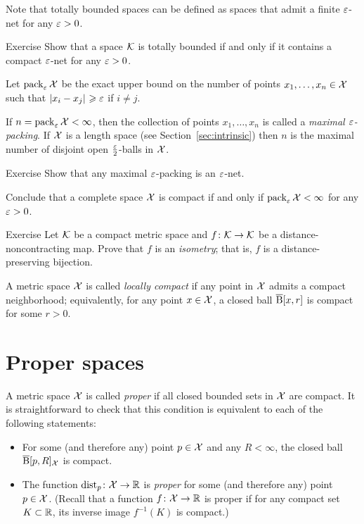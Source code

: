 Note that totally bounded spaces can be defined as spaces that admit a finite $\varepsilon$-net for any $\varepsilon>0$.

\begin{thm}{Exercise}\label{ex:compact-net}
Show that a space $\mathcal{K}$ is totally bounded if and only if it contains a compact $\varepsilon$-net for any $\varepsilon>0$. 
\end{thm}


Let $\operatorname{\rm pack}\nolimits_\varepsilon\mathcal{X}$ be the exact upper bound on the number of points $x_1,\z\dots,x_n\in \spc{X}$ such that $\dist{x_i}{x_j}{}\ge\eps$ if $i\ne j$.

If $n=\operatorname{\rm pack}\nolimits_\varepsilon\mathcal{X}<\infty$, then
the collection of points $x_1,\dots,x_n$ is called a \emph{maximal $\varepsilon$-packing}.
If $\mathcal{X}$ is a length space (see Section~\ref{sec:intrinsic}) then $n$ is the maximal number of disjoint open $\tfrac{\varepsilon}2$-balls in $\mathcal{X}$.

\begin{thm}{Exercise}\label{ex:pack-net}
Show that any maximal $\varepsilon$-packing is an $\varepsilon$-net.

Conclude that a complete space $\mathcal{X}$ is compact if and only if $\pack_\eps\spc{X}\z<\infty$ for any $\varepsilon>0$.
\end{thm}


\begin{thm}{Exercise}\label{ex:non-contracting-map}
Let $\mathcal{K}$  be a compact metric space and
$f\:\spc{K}\z\to \spc{K}$
be a distance-noncontracting map.
Prove that $f$ is an \emph{isometry};
that is, $f$ is a distance-preserving bijection.
\end{thm}

A metric space $\mathcal{X}$ is called \emph{locally compact} if any point in $\mathcal{X}$ admits a compact neighborhood;
equivalently, for any point $x\in\mathcal{X}$, a closed ball $\overline{\mathrm{B}}{}[x,r]$ is compact for some $r>0$.

\section{Proper spaces}

A metric space $\mathcal{X}$ is called \emph{proper} if all closed bounded sets in $\mathcal{X}$ are compact.
It is straightforward to check that this condition is equivalent to each of the following statements:
\begin{itemize}
\item For some (and therefore any) point $p\in \mathcal{X}$ and any $R<\infty$, 
the closed ball $\overline{\mathrm{B}}{}[p,R]_{\mathcal{X}}$ is compact. 
\item The function $\mathrm{dist}_p\colon\mathcal{X}\to\mathbb{R}$ is \emph{proper} for some (and therefore any) point $p\in \mathcal{X}$.
(Recall that a function $f\colon\mathcal{X}\to\mathbb{R}$ is proper if for any compact set $K\subset \mathbb{R}$, its inverse image 
$f^{-1}(K)$
is compact.)
\end{itemize}

